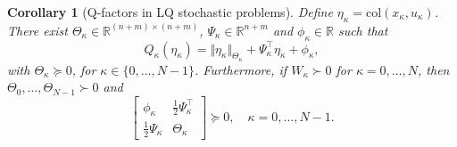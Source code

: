 \documentclass[10pt]{IEEEtran}      %
\newcommand{\R}{\mathbb{R}}
\newcommand{\col}{\mathrm{col}}
\theoremstyle{theorem}
\newtheorem{coro}{Corollary}
\theoremstyle{remark}
\begin{document}
\begin{coro}[Q-factors in LQ stochastic problems]\label{cor:Qfact}
Define $\eta_\kappa=\col(x_\kappa, u_\kappa)$. There exist $\Theta_\kappa\in\R^{(n+m)\times (n+m)}$,
 $\Psi_\kappa\in\R^{n+m}$ and $\phi_\kappa\in\R$ such that
\begin{equation}\label{eq:QfacQuad}
Q_\kappa(\eta_\kappa) = \Vert \eta_\kappa \Vert_{\Theta_\kappa} + \Psi_\kappa^\top \eta_\kappa +\phi_\kappa,
\end{equation}
with $\Theta_\kappa\succeq 0$,
for $\kappa\in\{0,\dots,N-1\}$. Furthermore, if $W_\kappa \succ 0$ for $\kappa=0,\dots,N$,
then $\Theta_0,\dots,\Theta_{N-1}\succ 0$ and
\begin{equation}\label{eq:schurc}
\left[\begin{array}{cc}
\phi_\kappa & \tfrac{1}{2}\Psi_{\kappa}^\top \\ \tfrac{1}{2}\Psi_{\kappa} & \Theta_{\kappa}
\end{array}\right] \succeq 0,\quad \kappa=0,\dots,N-1.
\end{equation}
\end{coro}
\end{document}

